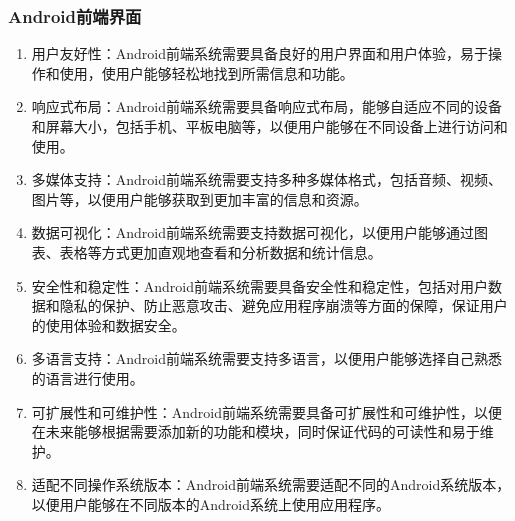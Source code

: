 \documentclass[UTF8]{ctexart}
\newcommand{\m}[1]{\textcolor{modify}{#1}}
\begin{document}
    \subsubsection{Android前端界面}
    \m{
    \begin{enumerate}
        \item 用户友好性：Android前端系统需要具备良好的用户界面和用户体验，易于操作和使用，使用户能够轻松地找到所需信息和功能。
        \item 响应式布局：Android前端系统需要具备响应式布局，能够自适应不同的设备和屏幕大小，包括手机、平板电脑等，以便用户能够在不同设备上进行访问和使用。
        \item 多媒体支持：Android前端系统需要支持多种多媒体格式，包括音频、视频、图片等，以便用户能够获取到更加丰富的信息和资源。
        \item 数据可视化：Android前端系统需要支持数据可视化，以便用户能够通过图表、表格等方式更加直观地查看和分析数据和统计信息。
        \item 安全性和稳定性：Android前端系统需要具备安全性和稳定性，包括对用户数据和隐私的保护、防止恶意攻击、避免应用程序崩溃等方面的保障，保证用户的使用体验和数据安全。
        \item 多语言支持：Android前端系统需要支持多语言，以便用户能够选择自己熟悉的语言进行使用。
        \item 可扩展性和可维护性：Android前端系统需要具备可扩展性和可维护性，以便在未来能够根据需要添加新的功能和模块，同时保证代码的可读性和易于维护。
        \item 适配不同操作系统版本：Android前端系统需要适配不同的Android系统版本，以便用户能够在不同版本的Android系统上使用应用程序。
    \end{enumerate}
    }
\end{document}
